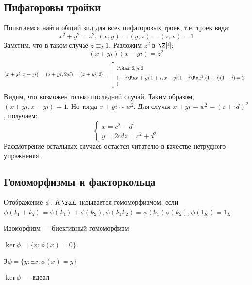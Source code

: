 \subsection{Пифагоровы тройки}
Попытаемся найти общий вид для всех пифагоровых троек, т.е. троек вида:
\[x^2 + y^2 = z^2, (x, y) = (y, z) = (z, x) = 1\]
Заметим, что в таком случае \(z \equiv_2 1\). Разложим \(z^2\) в \(\Z[i]\):
\[(x + yi)(x - yi) = z^2\]
\[(x + yi, x - yi) = (x + yi, 2yi) = (x + yi, 2) = \left[\begin{array}{l}
    2 \Ra x \vdots 2, y \vdots 2 \\
    1 + i \Ra x + yi \vdots 1 + i, x - yi \vdots 1 - i  \Ra x^2 \vdots (1 + i)(1 - i) = 2\\
    1
\end{array}\right.\]
Видим, что возможен только последний случай. Таким образом, \((x + yi, x - yi) = 1\). Но тогда \(x + yi \sim w^2\). Для случая \(x + yi = w^2 = (c + id)^2\), получаем:
\[\left\{\begin{array}{l}
    x = c^2 - d^2 \\
    y = 2cd
    z = c^2 + d^2
\end{array}\right.\]
Рассмотрение остальных случаев остается читателю в качестве нетрудного упражнения.

\subsection{Гомоморфизмы и факторкольца}
\begin{definition}
    Отображение \(\phi: K \ra L\) называется гомоморфизмом, если \(\phi(k_1 + k_2) = \phi(k_1) + \phi(k_2), \phi(k_1k_2) = \phi(k_1)\phi(k_2), \phi(1_K) = 1_L\).
\end{definition}

\begin{definition}
    Изоморфизм --- биективный гомоморфизм
\end{definition}

\begin{definition}
    \(\ker \phi = \{x: \phi(x) = 0\}\).
\end{definition}

\begin{definition}
    \(\Im \phi = \{y: \exists x: \phi(x) = y\}\)
\end{definition}

\begin{note}
    \(\ker \phi\) --- идеал.
\end{note}

